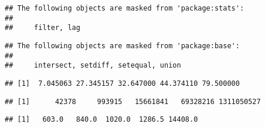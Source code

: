 \documentclass[]{article}
\newenvironment{Shaded}{\begin{snugshade}}{\end{snugshade}}
\newcommand{\KeywordTok}[1]{\textcolor[rgb]{0.13,0.29,0.53}{\textbf{#1}}}
\newcommand{\StringTok}[1]{\textcolor[rgb]{0.31,0.60,0.02}{#1}}
\newcommand{\OperatorTok}[1]{\textcolor[rgb]{0.81,0.36,0.00}{\textbf{#1}}}
\newcommand{\NormalTok}[1]{#1}
\begin{document}
\begin{verbatim}
## The following objects are masked from 'package:stats':
## 
##     filter, lag
\end{verbatim}

\begin{verbatim}
## The following objects are masked from 'package:base':
## 
##     intersect, setdiff, setequal, union
\end{verbatim}

\begin{Shaded}
\end{Shaded}

\begin{verbatim}
## [1]  7.045063 27.345157 32.647000 44.374110 79.500000
\end{verbatim}

\begin{Shaded}
\end{Shaded}

\begin{verbatim}
## [1]      42378     993915   15661841   69328216 1311050527
\end{verbatim}

\begin{Shaded}
\end{Shaded}

\begin{verbatim}
## [1]   603.0   840.0  1020.0  1286.5 14408.0
\end{verbatim}

\begin{Shaded}
\end{Shaded}
\end{document}
